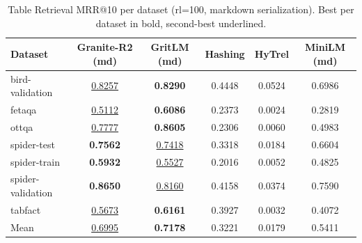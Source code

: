 \begin{table}[t]
\centering
\begin{tabular*}{\textwidth}{lccccc}
\hline
Dataset & Granite-R2 (md) & GritLM (md) & Hashing & HyTrel & MiniLM (md) \\
\hline
bird-validation & \underline{0.8257} & \textbf{0.8290} & 0.4448 & 0.0524 & 0.6986 \\
fetaqa & \underline{0.5112} & \textbf{0.6086} & 0.2373 & 0.0024 & 0.2819 \\
ottqa & \underline{0.7777} & \textbf{0.8605} & 0.2306 & 0.0060 & 0.4983 \\
spider-test & \textbf{0.7562} & \underline{0.7418} & 0.3318 & 0.0184 & 0.6604 \\
spider-train & \textbf{0.5932} & \underline{0.5527} & 0.2016 & 0.0052 & 0.4825 \\
spider-validation & \textbf{0.8650} & \underline{0.8160} & 0.4158 & 0.0374 & 0.7590 \\
tabfact & \underline{0.5673} & \textbf{0.6161} & 0.3927 & 0.0032 & 0.4072 \\
\hline
Mean & \underline{0.6995} & \textbf{0.7178} & 0.3221 & 0.0179 & 0.5411 \\
\hline
\end{tabular*}
\caption{Table Retrieval MRR@10 per dataset (rl=100, markdown serialization). Best per dataset in bold, second-best underlined.}
\label{tab:retrieval_main}
\end{table}
